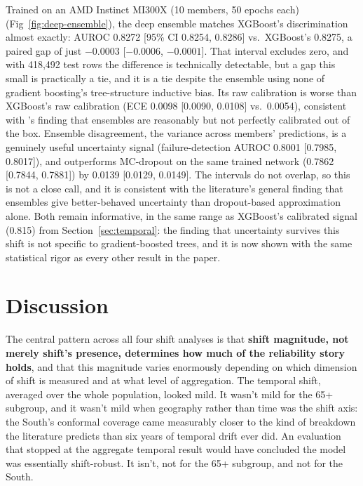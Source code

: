 \documentclass[12pt]{article}
\begin{document}
Trained on an AMD Instinct MI300X (10 members, 50 epochs each) (Fig~\ref{fig:deep-ensemble}), the deep ensemble matches XGBoost's discrimination almost exactly: AUROC 0.8272 [95\% CI 0.8254, 0.8286] vs.\ XGBoost's 0.8275, a paired gap of just $-0.0003$ [$-0.0006$, $-0.0001$]. That interval excludes zero, and with 418{,}492 test rows the difference is technically detectable, but a gap this small is practically a tie, and it is a tie despite the ensemble using none of gradient boosting's tree-structure inductive bias. Its raw calibration is worse than XGBoost's raw calibration (ECE 0.0098 [0.0090, 0.0108] vs.\ 0.0054), consistent with \citet{ovadia2019trust}'s finding that ensembles are reasonably but not perfectly calibrated out of the box. Ensemble disagreement, the variance across members' predictions, is a genuinely useful uncertainty signal (failure-detection AUROC 0.8001 [0.7985, 0.8017]), and outperforms MC-dropout on the same trained network (0.7862 [0.7844, 0.7881]) by 0.0139 [0.0129, 0.0149]. The intervals do not overlap, so this is not a close call, and it is consistent with the literature's general finding that ensembles give better-behaved uncertainty than dropout-based approximation alone. Both remain informative, in the same range as XGBoost's calibrated signal (0.815) from Section~\ref{sec:temporal}: the finding that uncertainty survives this shift is not specific to gradient-boosted trees, and it is now shown with the same statistical rigor as every other result in the paper.

\section{Discussion}

The central pattern across all four shift analyses is that \textbf{shift magnitude, not merely shift's presence, determines how much of the reliability story holds}, and that this magnitude varies enormously depending on which dimension of shift is measured and at what level of aggregation. The temporal shift, averaged over the whole population, looked mild. It wasn't mild for the 65+ subgroup, and it wasn't mild when geography rather than time was the shift axis: the South's conformal coverage came measurably closer to the kind of breakdown the literature predicts \citep{tibshirani2019conformal} than six years of temporal drift ever did. An evaluation that stopped at the aggregate temporal result would have concluded the model was essentially shift-robust. It isn't, not for the 65+ subgroup, and not for the South.
\end{document}
